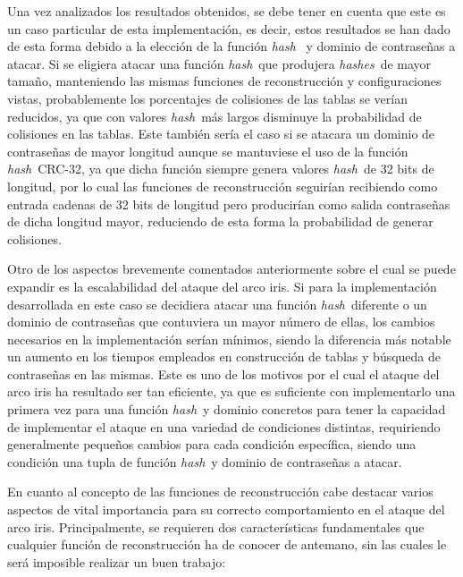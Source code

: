 \documentclass[12pt,spanish,listoffigures,listoftables,listofalgorithms]{tfgetsinf}
\newcommand{\hash}{\textit{hash}}
\newcommand{\hashes}{\textit{hashes}}
\begin{document}
Una vez analizados los resultados obtenidos, se debe tener en cuenta que este es un caso particular de esta implementación, es decir, estos resultados se han dado de esta forma debido a la elección de la función \hash~ y dominio de contraseñas a atacar. Si se eligiera atacar una función \hash~que produjera \hashes~de mayor tamaño, manteniendo las mismas funciones de reconstrucción y configuraciones vistas, probablemente los porcentajes de colisiones de las tablas se verían reducidos, ya que con valores \hash~más largos disminuye la probabilidad de colisiones en las tablas. Este también sería el caso si se atacara un dominio de contraseñas de mayor longitud aunque se mantuviese el uso de la función \hash~CRC-32, ya que dicha función siempre genera valores \hash~de 32 bits de longitud, por lo cual las funciones de reconstrucción seguirían recibiendo como entrada cadenas de 32 bits de longitud pero producirían como salida contraseñas de dicha longitud mayor, reduciendo de esta forma la probabilidad de generar colisiones.

Otro de los aspectos brevemente comentados anteriormente sobre el cual se puede expandir es la escalabilidad del ataque del arco iris. Si para la implementación desarrollada en este caso se decidiera atacar una función \hash~diferente o un dominio de contraseñas que contuviera un mayor número de ellas, los cambios necesarios en la implementación serían mínimos, siendo la diferencia más notable un aumento en los tiempos empleados en construcción de tablas y búsqueda de contraseñas en las mismas. Este es uno de los motivos por el cual el ataque del arco iris ha resultado ser tan eficiente, ya que es suficiente con implementarlo una primera vez para una función \hash~y dominio concretos para tener la capacidad de implementar el ataque en una variedad de condiciones distintas, requiriendo generalmente pequeños cambios para cada condición específica, siendo una condición una tupla de función \hash~y dominio de contraseñas a atacar.

En cuanto al concepto de las funciones de reconstrucción cabe destacar varios aspectos de vital importancia para su correcto comportamiento en el ataque del arco iris. Principalmente, se requieren dos características fundamentales que cualquier función de reconstrucción ha de conocer de antemano, sin las cuales le será imposible realizar un buen trabajo:
\end{document}
